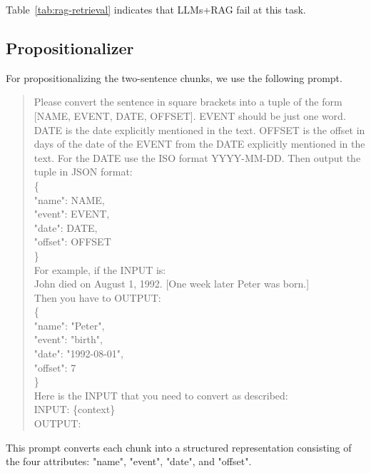 \documentclass[11pt]{article}
\begin{document}
Table~\ref{tab:rag-retrieval} indicates that LLMs+RAG fail at this task.





\subsection{Propositionalizer}
For  propositionalizing the two-sentence chunks, we use the
following prompt.

\begin{quote}
Please convert the sentence in square brackets into a tuple of the form [NAME, EVENT, DATE, OFFSET]. EVENT should be just one word. DATE is the date explicitly mentioned in the text. OFFSET is the offset in days of the date of the EVENT from the DATE explicitly mentioned in the text. For the DATE use the ISO format YYYY-MM-DD. Then output the tuple in JSON format:\\
\{ \\
"name": NAME, \\
"event": EVENT, \\
"date": DATE, \\
"offset": OFFSET \\
\} \\
For example, if the INPUT is:\\
John died on August 1, 1992. [One week later Peter was born.]\\
Then you have to OUTPUT:\\
\{ \\
"name": "Peter", \\
"event": "birth", \\
"date": "1992-08-01", \\
"offset": 7 \\
\} \\
Here is the INPUT that you need to convert as described: \\
INPUT: \{context\} \\
OUTPUT:
\end{quote}

This prompt 
converts each chunk into a structured
representation consisting of the four attributes: "name", "event",
"date", and "offset".
\end{document}
